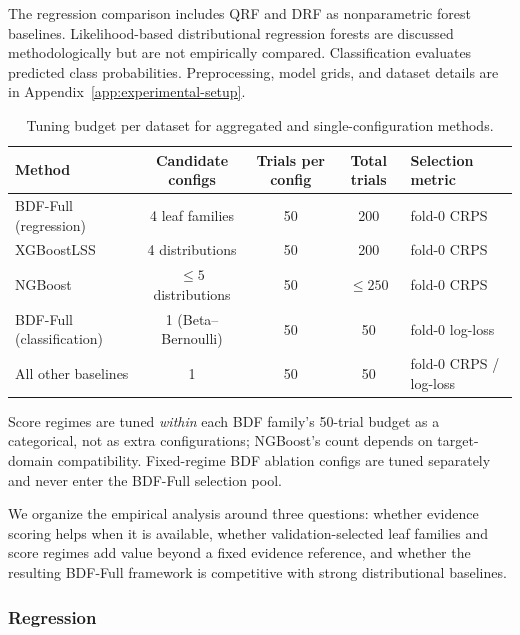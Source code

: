 The regression comparison includes QRF and DRF as nonparametric forest baselines. Likelihood-based distributional regression forests are discussed methodologically but are not empirically compared. Classification evaluates predicted class probabilities. Preprocessing, model grids, and dataset details are in Appendix~\ref{app:experimental-setup}.

\begin{table}[!ht]
\centering
\small
\caption{Tuning budget per dataset for aggregated and single-configuration methods.}
\label{tab:budget-summary}
\begin{tabular}{lcccl}
\toprule
Method & Candidate configs & Trials per config & Total trials & Selection metric \\
\midrule
BDF-Full (regression) & 4 leaf families & 50 & 200 & fold-0 CRPS \\
XGBoostLSS & 4 distributions & 50 & 200 & fold-0 CRPS \\
NGBoost & $\le 5$ distributions & 50 & $\le 250$ & fold-0 CRPS \\
BDF-Full (classification) & 1 (Beta--Bernoulli) & 50 & 50 & fold-0 log-loss \\
All other baselines & 1 & 50 & 50 & fold-0 CRPS / log-loss \\
\bottomrule
\end{tabular}
\par\smallskip\footnotesize{Score regimes are tuned \emph{within} each BDF family's 50-trial budget as a categorical, not as extra configurations; NGBoost's count depends on target-domain compatibility. Fixed-regime BDF ablation configs are tuned separately and never enter the BDF-Full selection pool.}
\end{table}

We organize the empirical analysis around three questions: whether evidence scoring helps when it is available, whether validation-selected leaf families and score regimes add value beyond a fixed evidence reference, and whether the resulting BDF-Full framework is competitive with strong distributional baselines.

\subsubsection{Regression}\label{subsubsec:exp_regression}

